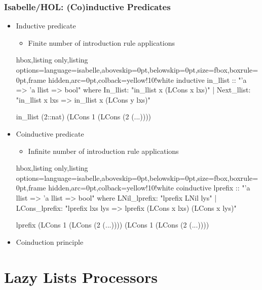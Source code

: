 \documentclass[aspectratio=169,10pt]{beamer}
\begin{document}
\begin{frame}[fragile]
  \frametitle{Isabelle/HOL: (Co)inductive Predicates}
  \begin{itemize}
    \item Inductive predicate
          \begin{itemize}
            \item Finite number of introduction rule applications
          \end{itemize}
\begin{tcblisting}{hbox,listing only,listing options={language=isabelle,aboveskip=0pt,belowskip=0pt},size=fbox,boxrule=0pt,frame hidden,arc=0pt,colback=yellow!10!white}
inductive in_llist :: "'a => 'a llist => bool" where
    In_llist: "in_llist x (LCons x lxs)"
  | Next_llist: "in_llist x lxs => in_llist x (LCons y lxs)"

in_llist (2::nat) (LCons 1 (LCons (2 (...))))
\end{tcblisting}
    \item Coinductive predicate
          \begin{itemize}
            \item Infinite number of introduction rule applications
          \end{itemize}
\begin{tcblisting}{hbox,listing only,listing options={language=isabelle,aboveskip=0pt,belowskip=0pt},size=fbox,boxrule=0pt,frame hidden,arc=0pt,colback=yellow!10!white}
coinductive lprefix :: "'a llist => 'a llist => bool" where
    LNil_lprefix: "lprefix LNil lys"
  | LCons_lprefix: "lprefix lxs lys => lprefix (LCons x lxs) (LCons x lys)"

lprefix (LCons 1 (LCons (2 (...)))) (LCons 1 (LCons (2 (...))))
\end{tcblisting}
    \item Coinduction principle
  \end{itemize}
\end{frame}

\section{Lazy Lists Processors}
\end{document}
